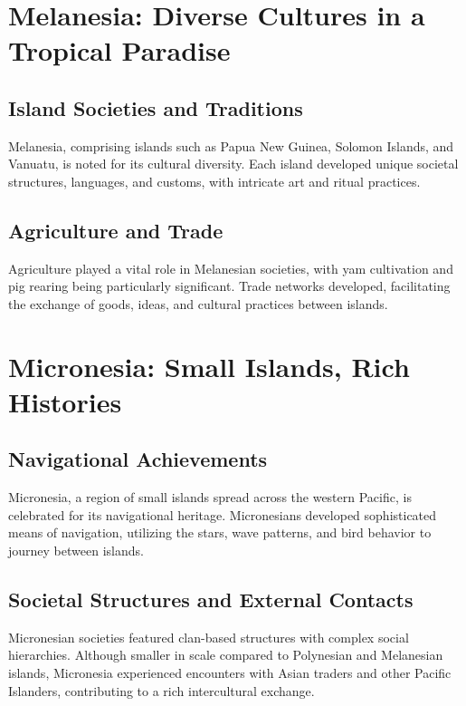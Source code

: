 \documentclass{book}
\begin{document}
\section{Melanesia: Diverse Cultures in a Tropical Paradise}
\label{sec:melanesia}

\subsection{Island Societies and Traditions}
\label{subsec:melanesia-societies-traditions}

Melanesia, comprising islands such as Papua New Guinea, Solomon Islands, and Vanuatu, is noted for its cultural diversity. Each island developed unique societal structures, languages, and customs, with intricate art and ritual practices.

\subsection{Agriculture and Trade}
\label{subsec:melanesia-agriculture-trade}

Agriculture played a vital role in Melanesian societies, with yam cultivation and pig rearing being particularly significant. Trade networks developed, facilitating the exchange of goods, ideas, and cultural practices between islands.

\section{Micronesia: Small Islands, Rich Histories}
\label{sec:micronesia}

\subsection{Navigational Achievements}
\label{subsec:micronesia-navigation}

Micronesia, a region of small islands spread across the western Pacific, is celebrated for its navigational heritage. Micronesians developed sophisticated means of navigation, utilizing the stars, wave patterns, and bird behavior to journey between islands.

\subsection{Societal Structures and External Contacts}
\label{subsec:micronesia-society-contacts}

Micronesian societies featured clan-based structures with complex social hierarchies. Although smaller in scale compared to Polynesian and Melanesian islands, Micronesia experienced encounters with Asian traders and other Pacific Islanders, contributing to a rich intercultural exchange.
\end{document}
